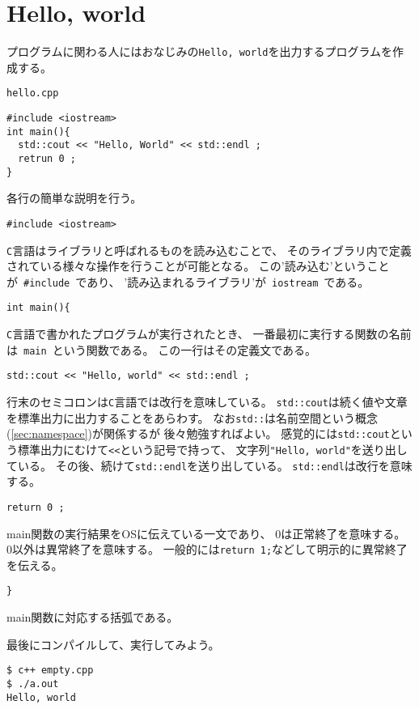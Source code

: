 \section{Hello, world}
プログラムに関わる人にはおなじみの\texttt{Hello, world}を出力するプログラムを作成する。
\begin{itembox}{\texttt{hello.cpp}}
\begin{verbatim}
#include <iostream>
int main(){
  std::cout << "Hello, World" << std::endl ;
  retrun 0 ;
}
\end{verbatim}
\end{itembox}
各行の簡単な説明を行う。
{\color{red}\begin{verbatim}
#include <iostream>
\end{verbatim} }
\texttt{C}言語はライブラリと呼ばれるものを読み込むことで、
そのライブラリ内で定義されている様々な操作を行うことが可能となる。
この'読み込む'ということが\ \verb|#include|\ であり、
'読み込まれるライブラリ'が\ \texttt{iostream}\ である。
{\color{red}\begin{verbatim}
int main(){
\end{verbatim}}
\texttt{C}言語で書かれたプログラムが実行されたとき、
一番最初に実行する関数の名前は\ \texttt{main}\ という関数である。
この一行はその定義文である。
{\color{red}\begin{verbatim}
std::cout << "Hello, world" << std::endl ;
\end{verbatim}}
行末のセミコロンは\texttt{C}言語では改行を意味している。
\texttt{std::cout}は続く値や文章を標準出力に出力することをあらわす。
なお\texttt{std::}は名前空間という概念(\ref{sec:namespace})が関係するが
後々勉強すればよい。
感覚的には\texttt{std::cout}という標準出力にむけて\texttt{<<}という記号で持って、
文字列\texttt{"Hello, world"}を送り出している。
その後、続けて\texttt{std::endl}を送り出している。
\texttt{std::endl}は改行を意味する。
{\color{red}\begin{verbatim}
return 0 ;
\end{verbatim}}
main関数の実行結果をOSに伝えている一文であり、
0は正常終了を意味する。
0以外は異常終了を意味する。
一般的には\texttt{return 1;}などして明示的に異常終了を伝える。
{\color{red}\begin{verbatim}
}
\end{verbatim}}
main関数に対応する括弧である。

最後にコンパイルして、実行してみよう。
\begin{verbatim}
$ c++ empty.cpp
$ ./a.out
Hello, world
\end{verbatim}

